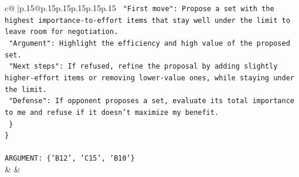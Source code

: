 \documentclass{article}
\begin{document}
{\begin{supertabular}{c@{$\;$}|p{.15\linewidth}@{}p{.15\linewidth}p{.15\linewidth}p{.15\linewidth}p{.15\linewidth}p{.15\linewidth}}
{{{\texttt{        "First move": Propose a set with the highest importance{-}to{-}effort items that stay well under the limit to leave room for negotiation.} \\
\texttt{        "Argument": Highlight the efficiency and high value of the proposed set.} \\
\texttt{        "Next steps": If refused, refine the proposal by adding slightly higher{-}effort items or removing lower{-}value ones, while staying under the limit.} \\
\texttt{        "Defense": If opponent proposes a set, evaluate its total importance to me and refuse if it doesn't maximize my benefit.} \\
\texttt{    \}} \\
\texttt{\}} \\
\\ 
\texttt{ARGUMENT: \{'B12', 'C15', 'B10'\}} \\
            }
        }
    }
    & & \\ \\


\end{supertabular}}
\end{document}
